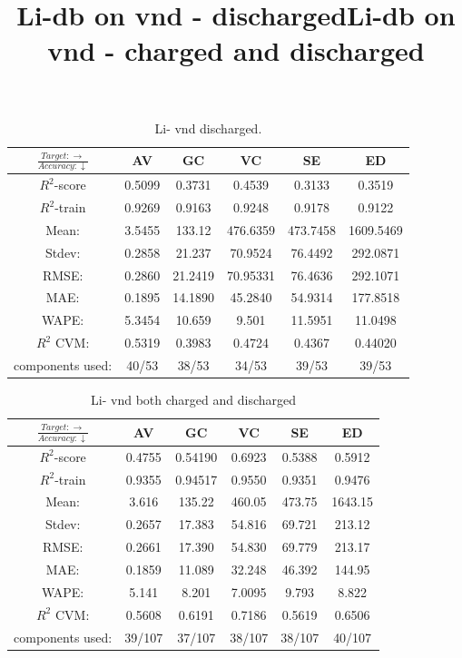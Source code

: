 \begin{table}[H]
\scriptsize
\title{Li-db on vnd - discharged}
\centering
\caption{Li- vnd discharged.}
\begin{tabular}{|c|c|c|c|c|c|}
	\hline 
	$\frac{Target: \rightarrow}{Accuracy:\downarrow} $ & AV & GC & VC & SE & ED 
	 \\ 
	\hline
	$R^2$-score 	& 0.5099 &  0.3731 & 0.4539 & 0.3133 &  0.3519\\ 
	\hline 
	$R^2$-train  	 & 0.9269 & 0.9163 & 0.9248 & 0.9178 & 0.9122 \\ 
	\hline
	Mean:	 	 &3.5455	& 133.12&476.6359&473.7458	&1609.5469\\
	\hline 
	Stdev:		 &0.2858	&21.237&70.9524&76.4492&292.0871\\
	\hline
	RMSE:		 & 0.2860 & 21.2419& 70.95331 & 76.4636 & 292.1071 \\ 
	\hline 
	MAE:	 	&0.1895& 14.1890 &  45.2840 & 54.9314 & 177.8518 \\ 
	\hline
	WAPE: 		& 5.3454 & 10.659 & 9.501  & 11.5951 &11.0498 \\
	\hline
	$R^2$ CVM: &  0.5319 & 0.3983 & 0.4724  &  0.4367 &0.44020 \\
	\hline
	components used: & 40/53 &  38/53 &  34/53  &  39/53 & 39/53 \\
	\hline
\end{tabular}
\label{tab:Li-vnd-i}
\end{table}

\begin{table}[H]
\scriptsize
\title{Li-db on vnd - charged and discharged}
\centering
\caption{Li- vnd both charged and discharged}
\begin{tabular}{|c|c|c|c|c|c|}
	\hline 
	$\frac{Target: \rightarrow}{Accuracy:\downarrow} $ & AV & GC & VC & SE & ED 
	 \\ 
	\hline
	$R^2$-score 	& 0.4755 & 0.54190 & 0.6923 & 0.5388 &  0.5912\\ 
	\hline 
	$R^2$-train 	& 0.9355 & 0.94517 & 0.9550 &   0.9351 & 0.9476 \\ 
	\hline
	Mean: 		&3.616	&135.22&460.05&473.75	&1643.15	\\
	\hline 
	Stdev:	 	&0.2657	&17.383	&54.816	&69.721	&213.12	\\
	\hline
	RMSE: 		& 0.2661 & 17.390	& 54.830 & 69.779	 & 213.17 \\ 
	\hline 
	MAE: 		&0.1859& 11.089	 &  32.248 & 46.392 & 144.95 \\ 
	\hline
	WAPE: 		& 5.141 & 8.201 	&  7.0095  & 9.793 &8.822 \\
	\hline
	$R^2$ CVM: 	&  0.5608 & 0.6191 & 0.7186  & 0.5619 &0.6506 \\
	\hline
	components used: & 39/107 & 37/107 & 38/107  & 38/107 &40/107 \\
	\hline
\end{tabular}
\label{tab:Li-vnd-iii}
\end{table}






